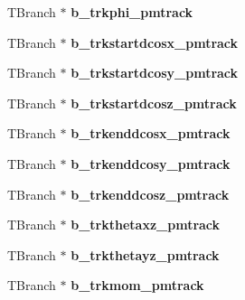 \begin{DoxyCompactItemize}
\item 
\hypertarget{classanatree_a597bd5a7432cb07f07aab4c5b8f7748d}{T\-Branch $\ast$ {\bfseries b\-\_\-trkphi\-\_\-pmtrack}}\label{classanatree_a597bd5a7432cb07f07aab4c5b8f7748d}

\item 
\hypertarget{classanatree_aa04ac1fdf4ec30016627e53978ae692e}{T\-Branch $\ast$ {\bfseries b\-\_\-trkstartdcosx\-\_\-pmtrack}}\label{classanatree_aa04ac1fdf4ec30016627e53978ae692e}

\item 
\hypertarget{classanatree_afb38adb7fc5053eb4e3e324123a1351e}{T\-Branch $\ast$ {\bfseries b\-\_\-trkstartdcosy\-\_\-pmtrack}}\label{classanatree_afb38adb7fc5053eb4e3e324123a1351e}

\item 
\hypertarget{classanatree_a827ce566874562399b3222d966adbb21}{T\-Branch $\ast$ {\bfseries b\-\_\-trkstartdcosz\-\_\-pmtrack}}\label{classanatree_a827ce566874562399b3222d966adbb21}

\item 
\hypertarget{classanatree_a066e97c989f79e437f2ffd1769c48296}{T\-Branch $\ast$ {\bfseries b\-\_\-trkenddcosx\-\_\-pmtrack}}\label{classanatree_a066e97c989f79e437f2ffd1769c48296}

\item 
\hypertarget{classanatree_abdb7f155ee425a630176bfa61c1774dc}{T\-Branch $\ast$ {\bfseries b\-\_\-trkenddcosy\-\_\-pmtrack}}\label{classanatree_abdb7f155ee425a630176bfa61c1774dc}

\item 
\hypertarget{classanatree_ac4c4cbce176d24bf41cf72d66a1a5126}{T\-Branch $\ast$ {\bfseries b\-\_\-trkenddcosz\-\_\-pmtrack}}\label{classanatree_ac4c4cbce176d24bf41cf72d66a1a5126}

\item 
\hypertarget{classanatree_ac2cbe06f8207532244b90074b0c638e0}{T\-Branch $\ast$ {\bfseries b\-\_\-trkthetaxz\-\_\-pmtrack}}\label{classanatree_ac2cbe06f8207532244b90074b0c638e0}

\item 
\hypertarget{classanatree_a10e874ea3fc896377207c3216f97fd3c}{T\-Branch $\ast$ {\bfseries b\-\_\-trkthetayz\-\_\-pmtrack}}\label{classanatree_a10e874ea3fc896377207c3216f97fd3c}

\item 
\hypertarget{classanatree_a1d52f3502b617cefdec02b0ccc626085}{T\-Branch $\ast$ {\bfseries b\-\_\-trkmom\-\_\-pmtrack}}\label{classanatree_a1d52f3502b617cefdec02b0ccc626085}


\end{DoxyCompactItemize}
